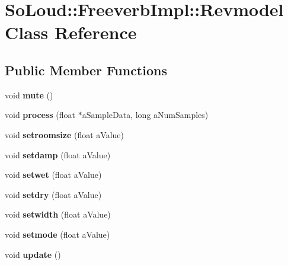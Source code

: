 \hypertarget{class_so_loud_1_1_freeverb_impl_1_1_revmodel}{}\section{So\+Loud\+::Freeverb\+Impl\+::Revmodel Class Reference}
\label{class_so_loud_1_1_freeverb_impl_1_1_revmodel}
\subsection*{Public Member Functions}
\begin{DoxyCompactItemize}
\item 
\mbox{\label{class_so_loud_1_1_freeverb_impl_1_1_revmodel_a3bb13bf37ce4c82e066d003bafb11e35}} 
void {\bfseries mute} ()
\item 
\mbox{\label{class_so_loud_1_1_freeverb_impl_1_1_revmodel_a90fcb2f8e83eebdd632e0022d0b5c943}} 
void {\bfseries process} (float $\ast$a\+Sample\+Data, long a\+Num\+Samples)
\item 
\mbox{\label{class_so_loud_1_1_freeverb_impl_1_1_revmodel_a96b57a8ffb9face66ebaa0d6ee051558}} 
void {\bfseries setroomsize} (float a\+Value)
\item 
\mbox{\label{class_so_loud_1_1_freeverb_impl_1_1_revmodel_adbf48b9a0d462d0f196695231d1d3850}} 
void {\bfseries setdamp} (float a\+Value)
\item 
\mbox{\label{class_so_loud_1_1_freeverb_impl_1_1_revmodel_a8397706b4982864e6627328367b75682}} 
void {\bfseries setwet} (float a\+Value)
\item 
\mbox{\label{class_so_loud_1_1_freeverb_impl_1_1_revmodel_abcb538c74f039d62132d841c922ddafe}} 
void {\bfseries setdry} (float a\+Value)
\item 
\mbox{\label{class_so_loud_1_1_freeverb_impl_1_1_revmodel_a3dc6f3100987c3bcd4379463fb3a960e}} 
void {\bfseries setwidth} (float a\+Value)
\item 
\mbox{\label{class_so_loud_1_1_freeverb_impl_1_1_revmodel_ae489a52a1b90bc4a9b94a9ba66d2944d}} 
void {\bfseries setmode} (float a\+Value)
\item 
\mbox{\label{class_so_loud_1_1_freeverb_impl_1_1_revmodel_a3e1d74345843f4de4e2f792799c20d44}} 
void {\bfseries update} ()
\end{DoxyCompactItemize}
